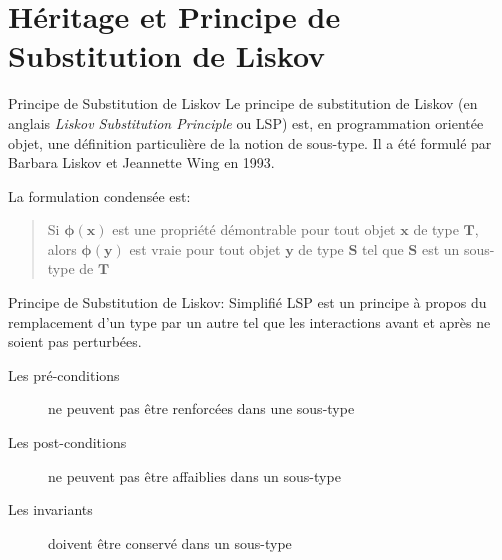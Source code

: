 \documentclass[10pt]{beamer}
\begin{document}
\section{Héritage et Principe de Substitution de Liskov}
\begin{frame}{Principe de Substitution de Liskov}
    Le principe de substitution de Liskov (en anglais \emph{Liskov Substitution Principle} ou \alert{LSP}) est, en programmation orientée objet, une définition particulière de la notion de sous-type. Il a été formulé par Barbara Liskov et Jeannette Wing en 1993. \cite{liskov_behavioral_1994}
    
    La formulation condensée est:
    \begin{quote}
        Si $\mathbf{\phi(x)}$ est une propriété démontrable pour tout objet $\mathbf{x}$ de type $\mathbf{T}$, alors $\mathbf{\phi(y)}$ est vraie pour tout objet $\mathbf{y}$ de type $\mathbf{S}$ tel que $\mathbf{S}$ est un sous-type de $\mathbf{T}$
        
    \end{quote}
\end{frame}
\begin{frame}{Principe de Substitution de Liskov: Simplifié}
    LSP est un principe à propos du remplacement d'un type par un autre tel que les interactions avant et après ne soient pas perturbées.

    \begin{description}
        \item[Les pré-conditions] ne peuvent pas être renforcées dans une sous-type
        \item[Les post-conditions] ne peuvent pas être affaiblies dans un sous-type
        \item[Les invariants] doivent être conservé dans un sous-type
    \end{description}
\end{frame}
\end{document}
